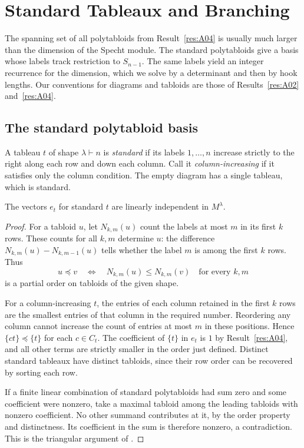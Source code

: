 \chapter{Standard Tableaux and Branching}

The spanning set of all polytabloids from Result~\ref{res:A04} is
usually much larger than the dimension of the Specht module. The
standard polytabloids give a basis whose labels track restriction to
\(S_{n-1}\). The same labels yield an integer recurrence for the
dimension, which we solve by a determinant and then by hook lengths.
Our conventions for diagrams and tabloids are those of
Results~\ref{res:A02} and~\ref{res:A04}.

\section{The standard polytabloid basis}

A tableau \(t\) of shape \(\lambda\vdash n\) is \emph{standard} if its
labels \(1,\ldots,n\) increase strictly to the right along each row and
down each column. Call it \emph{column-increasing} if it satisfies only
the column condition. The empty diagram has a single tableau, which is
standard.

\begin{proposition}\label{res:B01}
The vectors \(e_t\) for standard \(t\) are linearly independent in
\(M^\lambda\).
\end{proposition}

\begin{proof}
For a tabloid \(u\), let \(N_{k,m}(u)\) count the labels at most \(m\)
in its first \(k\) rows. These counts for all \(k,m\) determine \(u\):
the difference \(N_{k,m}(u)-N_{k,m-1}(u)\) tells whether the label
\(m\) is among the first \(k\) rows. Thus
\[
  u\preceq v\quad\Longleftrightarrow\quad
  N_{k,m}(u)\le N_{k,m}(v)\quad\text{for every } k,m
\]
is a partial order on tabloids of the given shape.

For a column-increasing \(t\), the entries of each column retained
in the first \(k\) rows are the smallest entries of that column in
the required number. Reordering any column cannot increase the count
of entries at most \(m\) in these positions. Hence
\(\{ct\}\preceq\{t\}\) for each \(c\in C_t\). The coefficient of
\(\{t\}\) in \(e_t\) is \(1\) by Result~\ref{res:A04}, and all other
terms are strictly smaller in the order just defined. Distinct
standard tableaux have distinct tabloids, since their row order can
be recovered by sorting each row.

If a finite linear combination of standard polytabloids had sum zero
and some coefficient were nonzero, take a maximal tabloid among the
leading tabloids with nonzero coefficient. No other summand contributes
at it, by the order property and distinctness. Its coefficient in the
sum is therefore nonzero, a contradiction. This is the triangular
argument of \cite[Section 2.5, Proposition 2.5.9]{sagan}.
\end{proof}

